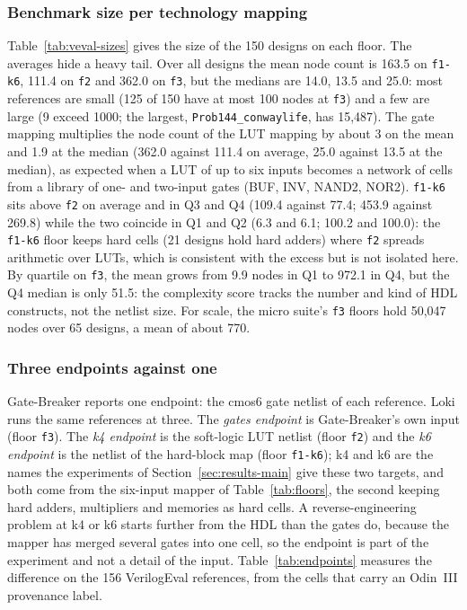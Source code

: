 \documentclass[conference]{IEEEtran}
\newcommand{\code}[1]{\texttt{#1}}
\begin{document}
\subsubsection{Benchmark size per technology mapping}
\label{sec:veval-sizes}

Table~\ref{tab:veval-sizes} gives the size of the 150 designs on each floor. The averages
hide a heavy tail. Over all designs the mean node count is 163.5 on \code{f1-k6}, 111.4 on
\code{f2} and 362.0 on \code{f3}, but the medians are 14.0, 13.5 and 25.0: most references
are small (125 of 150 have at most 100 nodes at \code{f3}) and a few are large (9 exceed
1000; the largest, \code{Prob144\_conwaylife}, has 15,487). The gate mapping multiplies
the node count of the LUT mapping by about 3 on the mean and 1.9 at the median (362.0 against 111.4 on average, 25.0 against 13.5 at the
median), as expected when a LUT of up to six inputs becomes a network of cells from a
library of one- and two-input gates (BUF, INV, NAND2, NOR2).
\code{f1-k6} sits above \code{f2} on average and in Q3 and Q4 (109.4 against 77.4; 453.9
against 269.8) while the two coincide in Q1 and Q2 (6.3 and 6.1; 100.2 and 100.0): the
\code{f1-k6} floor keeps hard cells (21 designs hold hard adders) where \code{f2} spreads
arithmetic over LUTs, which is consistent with the excess but is not isolated here. By quartile on \code{f3}, the mean grows from 9.9 nodes in Q1 to 972.1 in
Q4, but the Q4 median is only 51.5: the complexity score tracks the number and kind of HDL
constructs, not the netlist size. For scale, the micro suite's \code{f3} floors hold 50,047
nodes over 65 designs, a mean of about 770.



\subsubsection{Three endpoints against one}
\label{sec:endpoints}

Gate-Breaker reports one endpoint: the cmos6 gate netlist of each reference. Loki runs the same references at three. The \emph{gates endpoint} is Gate-Breaker's own input (floor \code{f3}). The \emph{k4 endpoint} is the soft-logic LUT netlist (floor \code{f2}) and the \emph{k6 endpoint} is the netlist of the hard-block map (floor \code{f1-k6}); k4 and k6 are the names the experiments of Section~\ref{sec:results-main} give these two targets, and both come from the six-input mapper of Table~\ref{tab:floors}, the second keeping hard adders, multipliers and memories as hard cells. A reverse-engineering problem at k4 or k6 starts further from the HDL than the gates do, because the mapper has merged several gates into one cell, so the endpoint is part of the experiment and not a detail of the input. Table~\ref{tab:endpoints} measures the difference on the 156 VerilogEval references, from the cells that carry an Odin~III provenance label.
\end{document}

